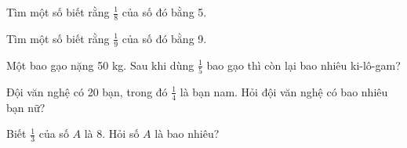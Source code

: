 \begin{ex}
Tìm một số biết rằng $\frac{1}{8}$ của số đó bằng 5.
\end{ex}

\begin{ex}
Tìm một số biết rằng $\frac{1}{9}$ của số đó bằng 9.
\end{ex}

\begin{ex}
Một bao gạo nặng 50 kg. Sau khi dùng $\frac{1}{5}$ bao gạo thì còn lại bao nhiêu ki-lô-gam?
\end{ex}

\begin{ex}
Đội văn nghệ có 20 bạn, trong đó $\frac{1}{4}$ là bạn nam. Hỏi đội văn nghệ có bao nhiêu bạn nữ?
\end{ex}

\begin{ex}
Biết $\frac{1}{3}$ của số $A$ là 8. Hỏi số $A$ là bao nhiêu?
\end{ex}
